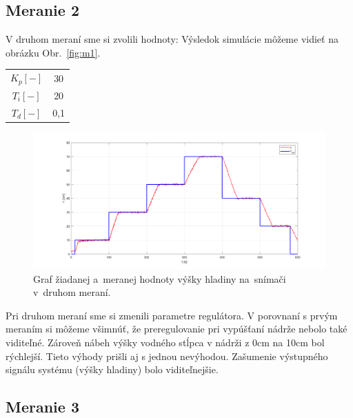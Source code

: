 \documentclass{article}
\begin{document}
\clearpage

\subsection{Meranie 2}
\label{sec:meranie2}

V druhom meraní sme si zvolili hodnoty:
Výsledok simulácie môžeme vidieť na obrázku Obr.~\ref{fig:m1}.

\begin{center}
\begin{tabular}{ |c|c| }
 \hline
 $K_p [-]$ & 30 \\
 $T_i [-]$ & 20 \\
 $T_d [-]$ & 0,1 \\
 \hline
\end{tabular}
\end{center}

\begin{figure}[!htbp]
	\begin{center}
		\includegraphics[width=\textwidth]{./include/meranie2.png}
	\end{center}
	\caption{Graf žiadanej a~meranej hodnoty výšky hladiny na~snímači v~druhom meraní.}
	\label{fig:m2}
\end{figure}

Pri druhom meraní sme si zmenili parametre regulátora. V porovnaní s prvým meraním si môžeme všimnúť,
že preregulovanie pri vypúšťaní nádrže nebolo také viditeľné. Zároveň nábeh výšky vodného stĺpca v nádrži
z 0cm na 10cm bol rýchlejší. Tieto výhody prišli aj s jednou nevýhodou. Zašumenie výstupného signálu
systému (výšky hladiny) bolo viditeľnejšie.

\clearpage

\subsection{Meranie 3}
\label{sec:meranie3}
\end{document}
